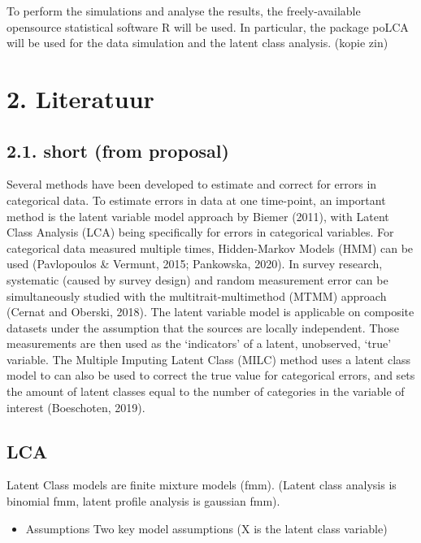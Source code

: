 \documentclass[
]{article}
\providecommand{\tightlist}{%
  \setlength{\itemsep}{0pt}\setlength{\parskip}{0pt}}
\begin{document}
To perform the simulations and analyse the results, the freely-available
opensource statistical software R will be used. In particular, the
package poLCA will be used for the data simulation and the latent class
analysis. (kopie zin)

\hypertarget{literatuur}{%
\section{2. Literatuur}\label{literatuur}}

\hypertarget{short-from-proposal}{%
\subsection{2.1. short (from proposal)}\label{short-from-proposal}}

Several methods have been developed to estimate and correct for errors
in categorical data. To estimate errors in data at one time-point, an
important method is the latent variable model approach by Biemer (2011),
with Latent Class Analysis (LCA) being specifically for errors in
categorical variables. For categorical data measured multiple times,
Hidden-Markov Models (HMM) can be used (Pavlopoulos \& Vermunt, 2015;
Pankowska, 2020). In survey research, systematic (caused by survey
design) and random measurement error can be simultaneously studied with
the multitrait-multimethod (MTMM) approach (Cernat and Oberski, 2018).
The latent variable model is applicable on composite datasets under the
assumption that the sources are locally independent. Those measurements
are then used as the `indicators' of a latent, unobserved, `true'
variable. The Multiple Imputing Latent Class (MILC) method uses a latent
class model to can also be used to correct the true value for
categorical errors, and sets the amount of latent classes equal to the
number of categories in the variable of interest (Boeschoten, 2019).

\hypertarget{lca}{%
\subsection{LCA}\label{lca}}

Latent Class models are finite mixture models (fmm). (Latent class
analysis is binomial fmm, latent profile analysis is gaussian fmm).

\begin{itemize}
\tightlist
\item
  Assumptions Two key model assumptions (X is the latent class variable)
\end{itemize}
\end{document}
